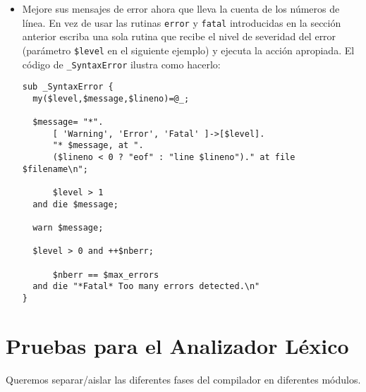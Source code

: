 \begin{itemize}
\begin{verbatim}
    #Always return something
      $input=~/\G(.)/sg
    and do {
      $1 eq "\n" and ++$tokenend;
      return ($1, [$1, $tokenbegin]);
    };
    #At EOF
    return('', undef);
}
\end{verbatim}
El operador \verb|tr| ha sido utilizado para contar los retornos de carro
(descrito en la sección 
\ref{section:tr}). El operador, ademas de reemplazar
devuelve el número de carácteres reeemplazados
o suprimidos: 
\begin{verbatim}
$cuenta = $cielo =~ tr/*/*/; # cuenta el numero de estrellas en cielo
\end{verbatim}
Para aprender soluciones alternativas consulte 
\verb|perldoc -q 'substring'|.
\item
Mejore sus mensajes de error ahora que lleva la cuenta de los números
de línea. En vez de usar las rutinas \verb|error| y \verb|fatal|
introducidas en la sección anterior escriba una sola rutina
que recibe el nivel de severidad del error (parámetro \verb|$level|
en el siguiente ejemplo)
y ejecuta la acción apropiada. El código de \verb|_SyntaxError|
ilustra como hacerlo:
\begin{verbatim}
sub _SyntaxError {
  my($level,$message,$lineno)=@_;

  $message= "*".
      [ 'Warning', 'Error', 'Fatal' ]->[$level].
      "* $message, at ".
      ($lineno < 0 ? "eof" : "line $lineno")." at file $filename\n";

      $level > 1
  and die $message;

  warn $message;

  $level > 0 and ++$nberr;

      $nberr == $max_errors
  and die "*Fatal* Too many errors detected.\n"
}
\end{verbatim}

\end{itemize}

\section{Pruebas para el Analizador Léxico}
\label{section:lexicomodular}
Queremos separar/aislar las diferentes fases
del compilador en diferentes módulos. 


